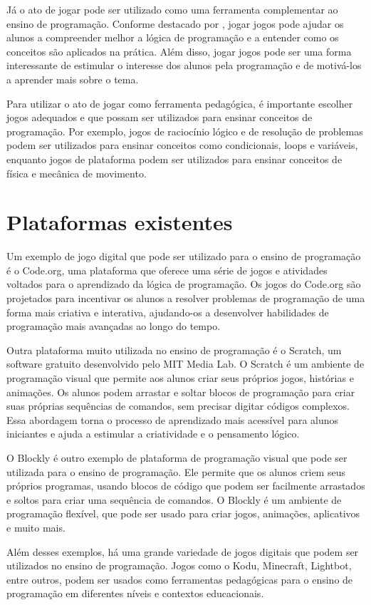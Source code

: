 Já o ato de jogar pode ser utilizado como uma ferramenta complementar ao ensino de programação. Conforme destacado por \cite{Pereira2016}, jogar jogos pode ajudar os alunos a compreender melhor a lógica de programação e a entender como os conceitos são aplicados na prática. Além disso, jogar jogos pode ser uma forma interessante de estimular o interesse dos alunos pela programação e de motivá-los a aprender mais sobre o tema.

Para utilizar o ato de jogar como ferramenta pedagógica, é importante escolher jogos adequados e que possam ser utilizados para ensinar conceitos de programação. Por exemplo, jogos de raciocínio lógico e de resolução de problemas podem ser utilizados para ensinar conceitos como condicionais, loops e variáveis, enquanto jogos de plataforma podem ser utilizados para ensinar conceitos de física e mecânica de movimento.

\section{Plataformas existentes}

Um exemplo de jogo digital que pode ser utilizado para o ensino de programação é o Code.org, uma plataforma que oferece uma série de jogos e atividades voltados para o aprendizado da lógica de programação. Os jogos do Code.org são projetados para incentivar os alunos a resolver problemas de programação de uma forma mais criativa e interativa, ajudando-os a desenvolver habilidades de programação mais avançadas ao longo do tempo.

Outra plataforma muito utilizada no ensino de programação é o Scratch, um software gratuito desenvolvido pelo MIT Media Lab. O Scratch é um ambiente de programação visual que permite aos alunos criar seus próprios jogos, histórias e animações. Os alunos podem arrastar e soltar blocos de programação para criar suas próprias sequências de comandos, sem precisar digitar códigos complexos. Essa abordagem torna o processo de aprendizado mais acessível para alunos iniciantes e ajuda a estimular a criatividade e o pensamento lógico.

O Blockly é outro exemplo de plataforma de programação visual que pode ser utilizada para o ensino de programação. Ele permite que os alunos criem seus próprios programas, usando blocos de código que podem ser facilmente arrastados e soltos para criar uma sequência de comandos. O Blockly é um ambiente de programação flexível, que pode ser usado para criar jogos, animações, aplicativos e muito mais.


Além desses exemplos, há uma grande variedade de jogos digitais que podem ser utilizados no ensino de programação. Jogos como o Kodu, Minecraft, Lightbot, entre outros, podem ser usados como ferramentas pedagógicas para o ensino de programação em diferentes níveis e contextos educacionais.

